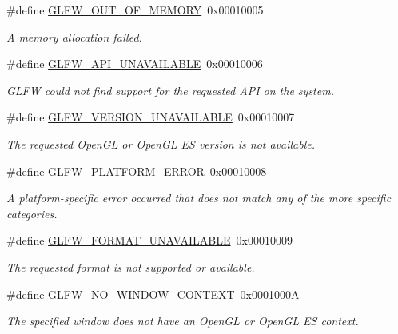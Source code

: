 \begin{DoxyCompactItemize}
\#define \mbox{\hyperlink{group__errors_ga9023953a2bcb98c2906afd071d21ee7f}{G\+L\+F\+W\+\_\+\+O\+U\+T\+\_\+\+O\+F\+\_\+\+M\+E\+M\+O\+RY}}~0x00010005
\begin{DoxyCompactList}\small\item\em A memory allocation failed. \end{DoxyCompactList}\item 
\#define \mbox{\hyperlink{group__errors_ga56882b290db23261cc6c053c40c2d08e}{G\+L\+F\+W\+\_\+\+A\+P\+I\+\_\+\+U\+N\+A\+V\+A\+I\+L\+A\+B\+LE}}~0x00010006
\begin{DoxyCompactList}\small\item\em G\+L\+FW could not find support for the requested A\+PI on the system. \end{DoxyCompactList}\item 
\#define \mbox{\hyperlink{group__errors_gad16c5565b4a69f9c2a9ac2c0dbc89462}{G\+L\+F\+W\+\_\+\+V\+E\+R\+S\+I\+O\+N\+\_\+\+U\+N\+A\+V\+A\+I\+L\+A\+B\+LE}}~0x00010007
\begin{DoxyCompactList}\small\item\em The requested Open\+GL or Open\+GL ES version is not available. \end{DoxyCompactList}\item 
\#define \mbox{\hyperlink{group__errors_gad44162d78100ea5e87cdd38426b8c7a1}{G\+L\+F\+W\+\_\+\+P\+L\+A\+T\+F\+O\+R\+M\+\_\+\+E\+R\+R\+OR}}~0x00010008
\begin{DoxyCompactList}\small\item\em A platform-\/specific error occurred that does not match any of the more specific categories. \end{DoxyCompactList}\item 
\#define \mbox{\hyperlink{group__errors_ga196e125ef261d94184e2b55c05762f14}{G\+L\+F\+W\+\_\+\+F\+O\+R\+M\+A\+T\+\_\+\+U\+N\+A\+V\+A\+I\+L\+A\+B\+LE}}~0x00010009
\begin{DoxyCompactList}\small\item\em The requested format is not supported or available. \end{DoxyCompactList}\item 
\#define \mbox{\hyperlink{group__errors_gacff24d2757da752ae4c80bf452356487}{G\+L\+F\+W\+\_\+\+N\+O\+\_\+\+W\+I\+N\+D\+O\+W\+\_\+\+C\+O\+N\+T\+E\+XT}}~0x0001000A
\begin{DoxyCompactList}\small\item\em The specified window does not have an Open\+GL or Open\+GL ES context. \end{DoxyCompactList}\end{DoxyCompactItemize}


